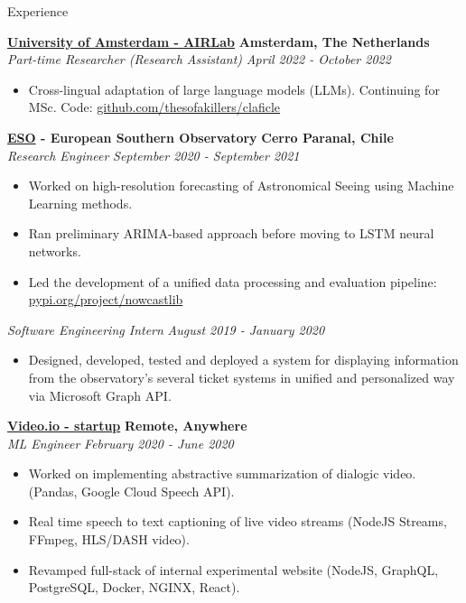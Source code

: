 \documentclass{resume} %
\begin{document}
\begin{rSection}{Experience}

	{\bf \href{https://icai.ai/airlab/}{University of Amsterdam - AIRLab}} \hfill \textbf{Amsterdam,
		The Netherlands}
	\\ \textit{Part-time Researcher (Research Assistant)} \hfill {\em April 2022 - October 2022}
	\begin{itemize}\vspace{-0.5em}
		\item Cross-lingual adaptation of large language models (LLMs).
		      Continuing for MSc. Code:
		      \href{https://github.com/thesofakillers/claficle}{github.com/thesofakillers/claficle}
	\end{itemize}

	{\bf \href{https://www.eso.org}{ESO} - European Southern Observatory} \hfill \textbf{Cerro Paranal, Chile}
	\\ \textit{Research Engineer} \hfill {\em September 2020 - September 2021}
	\begin{itemize}\vspace{-0.5em}
		\item Worked on high-resolution forecasting of Astronomical Seeing using Machine Learning
		      methods.
		\item Ran preliminary ARIMA-based approach before moving to LSTM neural networks.
		\item Led the development of a unified data processing and evaluation
		      pipeline: \href{https://pypi.org/project/nowcastlib/}{pypi.org/project/nowcastlib}
	\end{itemize}
	\textit{Software Engineering Intern} \hfill {\em August 2019 - January 2020}
	\begin{itemize}\vspace{-0.5em}
		\item Designed, developed, tested and deployed a system for displaying information from the
		      observatory's several ticket systems in unified and personalized way via Microsoft Graph API.
	\end{itemize}

	{\bf \href{https://video.io/}{Video.io - startup}} \hfill \textbf{Remote, Anywhere}
	\\ \textit{ML Engineer} \hfill {\em February 2020 - June 2020}
	\begin{itemize}\vspace{-0.5em}
		\item Worked on implementing abstractive summarization of dialogic video. (Pandas, Google Cloud
		      Speech API).
		\item Real time speech to text captioning of live video streams (NodeJS Streams, FFmpeg,
		      HLS/DASH video).
		\item Revamped full-stack of internal experimental website (NodeJS, GraphQL, PostgreSQL, Docker,
		      NGINX, React).
	\end{itemize}


\end{rSection}
\end{document}

